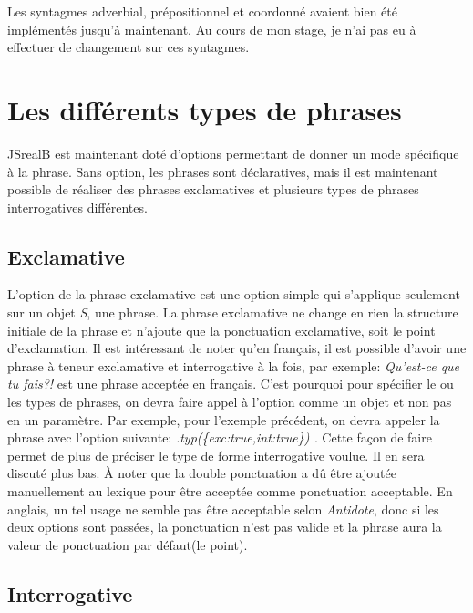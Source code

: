 \documentclass[11pt]{article} %
\newcommand{\system}[1]{\textsf{#1}}
\newcommand{\JSB}{\system{JSrealB}}
\begin{document}
Les syntagmes adverbial, prépositionnel et coordonné avaient bien
été implémentés jusqu'à maintenant. Au cours de mon stage, je n'ai
pas eu à effectuer de changement sur ces syntagmes.

\section{Les différents types de phrases}
\JSB{} est maintenant doté d'options permettant de donner un mode
spécifique à la phrase. Sans option, les phrases sont déclaratives,
mais il est maintenant possible de réaliser des phrases exclamatives
et plusieurs types de phrases interrogatives différentes. 

\subsection{Exclamative}

L'option de la phrase exclamative est une option simple qui s'applique
seulement sur un objet \emph{S}, une phrase. La phrase exclamative
ne change en rien la structure initiale de la phrase et n'ajoute que
la ponctuation exclamative, soit le point d'exclamation. Il est intéressant
de noter qu'en français, il est possible d'avoir une phrase à teneur
exclamative et interrogative à la fois, par exemple: \emph{Qu'est-ce
que tu fais?!} est une phrase acceptée en français. C'est pourquoi
pour spécifier le ou les types de phrases, on devra faire appel à
l'option comme un objet et non pas en un paramètre. Par exemple, pour
l'exemple précédent, on devra appeler la phrase avec l'option suivante:
\emph{.typ(\{exc:true,int:true\}) . }Cette façon de faire permet de
plus de préciser le type de forme interrogative voulue. Il en sera
discuté plus bas. À noter que la double ponctuation a dû être ajoutée
manuellement au lexique pour être acceptée comme ponctuation acceptable.
En anglais, un tel usage ne semble pas être acceptable selon \emph{Antidote},
donc si les deux options sont passées, la ponctuation n'est pas valide
et la phrase aura la valeur de ponctuation par défaut(le point).

\subsection{Interrogative}
\label{question}
\end{document}
